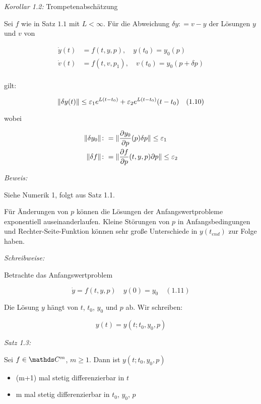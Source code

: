 \emph{Korollar 1.2:} Trompetenabschätzung

Sei $f$ wie in Satz $1.1$ mit $L < \infty$. Für die Abweichung $\delta y \colon= v-y$ der Lösungen $y$ und $v$ von

\begin{align*}
\dot y(t) &= f(t,y,p), \quad y(t_0) = y_0(p) \\
\dot v(t) &= f(t,v,p_1), \quad v(t_0) = y_0(p + \delta p) \\
\end{align*}

gilt:

\[ \|\delta y(t) \| \leq \varepsilon_1 e^{L(t-t_0)} + \varepsilon_2 e^{L(t-t_0)}(t-t_0) \quad (1.10)\]

wobei

\begin{align*}
\|\delta y_0\| \colon&= \| \frac{\partial y_0}{\partial p} (p) \delta p \| \leq \varepsilon_1 \\
\|\delta f\| \colon&= \| \frac{\partial f}{\partial p} (t,y,p) \partial p \| \leq \varepsilon_2
\end{align*}

\emph{Beweis:}

Siehe Numerik 1, folgt aus Satz 1.1.


Für Änderungen von $p$ können die Lösungen der Anfangswertprobleme exponentiell auseinanderlaufen. Kleine Störungen von $p$ in Anfangsbedingungen und Rechter-Seite-Funktion können sehr große Unterschiede in $y(t_{end})$ zur Folge haben.


\emph{Schreibweise:}

Betrachte das Anfangswertproblem

\[ \dot y = f(t,y,p) \quad y(0) = y_0 \quad (1.11) \]

Die Lösung $y$ hängt von $t$, $t_0$, $y_0$ und $p$ ab. Wir schreiben:

\[ y(t) = y(t; t_0, y_0, p) \]

\emph{Satz 1.3:}

Sei $f \in \C^m$, $m \geq 1$. Dann ist $y(t; t_0, y_0, p)$

\begin{itemize}
\item (m+1) mal stetig differenzierbar in $t$
\item m mal stetig differenzierbar in $t_0$, $y_0$, $p$
\end{itemize}

